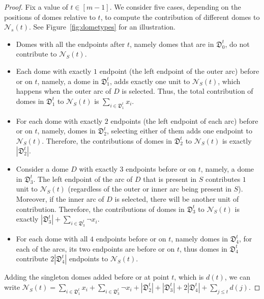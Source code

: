\documentclass[letterpaper,11pt]{article}
\begin{document}
\begin{proof}
Fix a value of $t\in [m-1]$. We consider five cases, depending on the positions of domes relative to $t$, to compute the contribution of different domes to $\mathcal{N}_s(t)$. See Figure~\ref{fig:dometypes} for an illustration. 

\begin{itemize}
    \item Domes with all the endpoints after $t$, namely domes that are in $\mathfrak{D}_0^t$, do not contribute to $\mathcal{N}_S(t)$.

    \item Each dome with exactly $1$ endpoint (the left endpoint of the outer arc) before or on $t$, namely, a dome in $\mathfrak{D}_1^t$, adds exactly one unit to $\mathcal{N}_S(t)$, which happens when the outer arc of $D$ is selected. Thus, the total contribution of domes in $\mathfrak{D}_1^t$ to  $\mathcal{N}_S(t)$ is $\sum_{i \in \mathfrak{D}_1^t} x_i$.
    
    \item For each dome with exactly $2$ endpoints (the left endpoint of each arc) before or on $t$, namely, domes in $\mathfrak{D}_2^t$, selecting either of them adds one endpoint to $\mathcal{N}_S(t)$. Therefore, the contributions of domes in $\mathfrak{D}_2^t$ to $\mathcal{N}_S(t)$ is exactly $|\mathfrak{D}_2^t|$.

    
    \item Consider a dome $D$ with exactly $3$ endpoints before or on $t$, namely, a dome in $\mathfrak{D}_3^t$. The left endpoint of the arc of $D$ that is present in $S$ contributes $1$ unit to $\mathcal{N}_S(t)$ (regardless of the outer or inner arc being present in $S$). Moreover, if the inner arc of $D$ is selected, there will be another unit of contribution. Therefore, the contributions of  domes in $\mathfrak{D}_3^t$ to $\mathcal{N}_S(t)$ is exactly $|\mathfrak{D}_3^t| + \sum_{i \in \mathfrak{D}_3^t} \neg{x_i}$.

    \item For each dome with all $4$ endpoints before or on $t$, namely domes in $\mathfrak{D}_4^t$, for each of the arcs, its two endpoints are before or on $t$, thus domes in $\mathfrak{D}^t_4$ contribute $2|\mathfrak{D}_4^t|$ endpoints to $\mathcal{N}_S(t)$. 
    
\end{itemize}
Adding the singleton domes added before or at point $t$, which is $d(t)$, we can write $\mathcal{N}_S(t) = \sum_{i \in \mathfrak{D}_1^t} x_i + \sum_{i \in \mathfrak{D}_3^t} \neg{x_i} +|\mathfrak{D}_2^t| +|\mathfrak{D}_3^t| + 2|\mathfrak{D}_4^t| + \sum_{j \leq t} d(j)$.
\end{proof}
\end{document}
